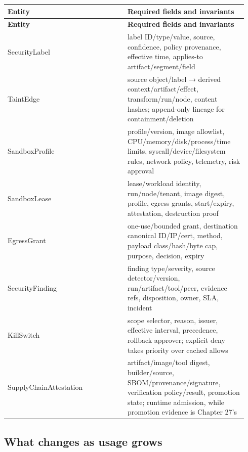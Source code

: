\BookTableStart
\small
\begin{longtable}{@{}Y{0.4700\linewidth}Y{0.4700\linewidth}@{}}
\color{white}\bfseries \textbf{Entity} & \color{white}\bfseries \textbf{Required fields and invariants} \\
\endfirsthead
{}
\color{white}\bfseries \textbf{Entity} & \color{white}\bfseries \textbf{Required fields and invariants} \\
\endhead
SecurityLabel & label ID/type/value, source, confidence, policy provenance, effective time, applies-to artifact/segment/field \\
TaintEdge & source object/label → derived context/artifact/effect, transform/run/node, content hashes; append-only lineage for containment/deletion \\
SandboxProfile & profile/version, image allowlist, CPU/memory/disk/process/time limits, syscall/device/filesystem rules, network policy, telemetry, risk approval \\
SandboxLease & lease/workload identity, run/node/tenant, image digest, profile, egress grants, start/expiry, attestation, destruction proof \\
EgressGrant & one-use/bounded grant, destination canonical ID/IP/cert, method, payload class/hash/byte cap, purpose, decision, expiry \\
SecurityFinding & finding type/severity, source detector/version, run/artifact/tool/peer, evidence refs, disposition, owner, SLA, incident \\
KillSwitch & scope selector, reason, issuer, effective interval, precedence, rollback approver; explicit deny takes priority over cached allows \\
SupplyChainAttestation & artifact/image/tool digest, builder/source, SBOM/provenance/signature, verification policy/result, promotion state; runtime admission, while promotion evidence is Chapter 27's \\
\end{longtable}
\BookTableEnd

\subsection{What changes as usage grows}

